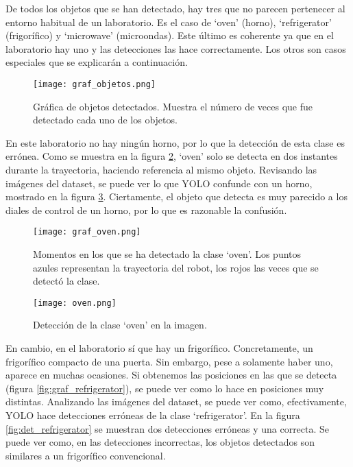 De todos los objetos que se han detectado, hay tres que no parecen pertenecer al entorno habitual de un laboratorio. Es el caso de `oven' (horno), `refrigerator' (frigorífico) y `microwave' (microondas). Este último es coherente ya que en el laboratorio hay uno y las detecciones las hace correctamente. Los otros son casos especiales que se explicarán a continuación.\\

\begin{figure}[h]
	\begin{center} 
		\texttt{[image: graf\_objetos.png]}
	\end{center}
	\caption{Gráfica de objetos detectados. Muestra el número de veces que fue detectado cada uno de los objetos.}
	\label{fig:graf_objetos}
\end{figure}

En este laboratorio no hay ningún horno, por lo que la detección de esta clase es errónea. Como se muestra en la figura \ref{fig:graf_oven}, `oven' solo se detecta en dos instantes durante la trayectoria, haciendo referencia al mismo objeto. Revisando las imágenes del dataset, se puede ver lo que YOLO confunde con un horno, mostrado en la figura \ref{fig:det_oven}. Ciertamente, el objeto que detecta es muy parecido a los diales de control de un horno, por lo que es razonable la confusión.\\

\begin{figure}[h]
	\begin{center} 
		\texttt{[image: graf\_oven.png]}
	\end{center}
	\caption{Momentos en los que se ha detectado la clase `oven'. Los puntos azules representan la trayectoria del robot, los rojos las veces que se detectó la clase.}
	\label{fig:graf_oven}
\end{figure}

\begin{figure}[h]
	\begin{center} 
		\texttt{[image: oven.png]}
	\end{center}
	\caption{Detección de la clase `oven' en la imagen.}
	\label{fig:det_oven}
\end{figure}

En cambio, en el laboratorio sí que hay un frigorífico. Concretamente, un frigorífico compacto de una puerta. Sin embargo, pese a solamente haber uno, aparece en muchas ocasiones. Si obtenemos las posiciones en las que se detecta (figura \ref{fig:graf_refrigerator}), se puede ver como lo hace en posiciones muy distintas. Analizando las imágenes del dataset, se puede ver como, efectivamente, YOLO hace detecciones erróneas de la clase `refrigerator'. En la figura \ref{fig:det_refrigerator} se muestran dos detecciones erróneas y una correcta. Se puede ver como, en las detecciones incorrectas, los objetos detectados son similares a un frigorífico convencional.\\

